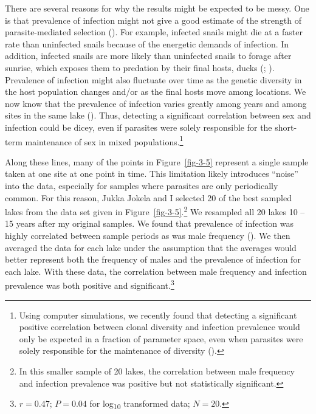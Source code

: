 \documentclass[
  letterpaper,
]{book}
\begin{document}
There are several reasons for why the results might be expected to be
messy. One is that prevalence of infection might not give a good
estimate of the strength of parasite-mediated selection
(). For example, infected snails
might die at a faster rate than uninfected snails because of the
energetic demands of infection. In addition, infected snails are more
likely than uninfected snails to forage after sunrise, which exposes
them to predation by their final hosts, ducks
(;
). Prevalence of
infection might also fluctuate over time as the genetic diversity in the
host population changes and/or as the final hosts move among locations.
We now know that the prevalence of infection varies greatly among years
and among sites in the same lake (). Thus, detecting a significant correlation between
sex and infection could be dicey, even if parasites were solely
responsible for the short-term maintenance of sex in mixed
populations.\footnote{Using computer simulations, we recently found that
  detecting a significant positive correlation between clonal diversity
  and infection prevalence would only be expected in a fraction of
  parameter space, even when parasites were solely responsible for the
  maintenance of diversity ().}

Along these lines, many of the points in Figure~\ref{fig-3-5} represent
a single sample taken at one site at one point in time. This limitation
likely introduces ``noise'' into the data, especially for samples where
parasites are only periodically common. For this reason, Jukka Jokela
and I selected 20 of the best sampled lakes from the data set given in
Figure~\ref{fig-3-5}.\footnote{In this smaller sample of 20 lakes, the
  correlation between male frequency and infection prevalence was
  positive but not statistically significant.} We resampled all 20 lakes
10 -- 15 years after my original samples. We found that prevalence of
infection was highly correlated between sample periods as was male
frequency (). We then
averaged the data for each lake under the assumption that the averages
would better represent both the frequency of males and the prevalence of
infection for each lake. With these data, the correlation between male
frequency and infection prevalence was both positive and
significant.\footnote{\(r = 0.47\); \(P = 0.04\) for
  log\textsubscript{10} transformed data; \(N = 20\).}
\end{document}
